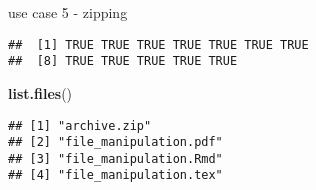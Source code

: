 \documentclass[ignorenonframetext,]{beamer}
\newenvironment{Shaded}{\begin{snugshade}}{\end{snugshade}}
\newcommand{\KeywordTok}[1]{\textcolor[rgb]{0.13,0.29,0.53}{\textbf{{#1}}}}
\newcommand{\DataTypeTok}[1]{\textcolor[rgb]{0.13,0.29,0.53}{{#1}}}
\newcommand{\StringTok}[1]{\textcolor[rgb]{0.31,0.60,0.02}{{#1}}}
\newcommand{\NormalTok}[1]{{#1}}
\begin{document}
\begin{frame}[fragile]{use case 5 - zipping}

\begin{Shaded}
\end{Shaded}

\begin{verbatim}
##  [1] TRUE TRUE TRUE TRUE TRUE TRUE TRUE
##  [8] TRUE TRUE TRUE TRUE TRUE
\end{verbatim}

\begin{Shaded}
\begin{Highlighting}[]
\KeywordTok{list.files}\NormalTok{()}
\end{Highlighting}
\end{Shaded}

\begin{verbatim}
## [1] "archive.zip"          
## [2] "file_manipulation.pdf"
## [3] "file_manipulation.Rmd"
## [4] "file_manipulation.tex"
\end{verbatim}

\end{frame}
\end{document}
